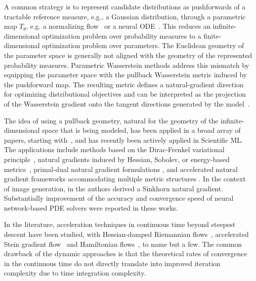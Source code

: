 \documentclass{article} %
\numberwithin{equation}{subsection}
\numberwithin{theorem}{section}
\begin{document}
     A common strategy is to represent candidate distributions as pushforwards of a tractable reference measure, e.g., a Gaussian distribution,  through a parametric map $T_\theta$, e.g.  %
     a normalizing flow~\cite{papamakarios2021normalizing} or a neural ODE~\cite{chen2018neural}. 
    This reduces an infinite-dimensional optimization problem over probability measures to a finite-dimensional optimization problem over parameters.
    The Euclidean geometry of the parameter space is generally not aligned with the geometry of the represented probability measures. 
    Parametric Wasserstein methods address this mismatch by equipping the parameter space with the pullback Wasserstein metric induced by the pushforward map. 
    The resulting metric defines a natural-gradient direction for optimizing distributional objectives and can be interpreted as the projection of the Wasserstein gradient onto the tangent directions generated by the model~\cite{liu_neural_2022,jin_parameterized_2025,wu2025parameterized}. 

    The idea of using a pullback geometry, natural for the geometry of the infinite-dimensional space that is being modeled, has been applied in a broad array of papers, starting with~\cite{amari1998natural}, and has recently been actively applied in Scientific ML.
    The applications include methods based on the Dirac-Frenkel variational principle~\cite{du_evolutional_2021, bruna_neural_2024, wu_deep_2025}, natural gradients induced by Hessian, Sobolev, or energy-based metrics~\cite{nurbekyan2023efficient,muller2023achieving,chen_teng_2024}, primal-dual natural gradient formulations \cite{liu_natural_2024}, and accelerated natural gradient frameworks accommodating multiple metric structures \cite{li_accelerated_2025}. In the context of image generation, in \cite{shen_sinkhorn_nodate} the authors derived a Sinkhorn natural gradient. 
    Substantially improvement of the accuracy and convergence speed of neural network-based PDE solvers were reported in these works. 

        
    In the literature, acceleration techniques in continuous time beyond steepest descent have been studied, with Hessian-damped Riemannian flows~\cite{li_accelerated_2025}, accelerated Stein gradient flow~\cite{stein2025accelerated} and Hamiltonian flows~\cite{chen2025accelerating}, to name but a few. 
    The common drawback of the dynamic approaches is that the theoretical rates of  convergence in the continuous time do not directly translate into improved iteration complexity due to time integration complexity. 
\end{document}

